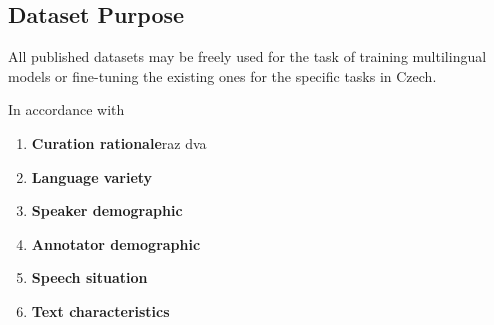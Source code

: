 \subsection{Dataset Purpose}
All published datasets may be freely used for the task of training multilingual models or fine-tuning the existing ones for the specific tasks in Czech.

In accordance with~\cite{bender2018data}

\begin{enumerate}
    \item \textbf{Curation rationale}\smallskip raz dva
    \item \textbf{Language variety}
    \item \textbf{Speaker demographic}
    \item \textbf{Annotator demographic}
    \item \textbf{Speech situation}
    \item \textbf{Text characteristics}
\end{enumerate}
